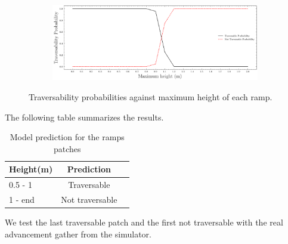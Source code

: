 \documentclass[../document.tex]{subfiles}
\begin{document}
\begin{figure} [htbp]
    \centering
\begin{subfigure}[b]{1\textwidth}
    \includegraphics[width=\linewidth]{../img/5/custom_patches/ramp/predictions.png}
    \end{subfigure}
    \caption{Traversability probabilities against maximum height of each ramp.}
\end{figure}
The following table summarizes the results.

\begin{table} [htbp]
    \centering
    \begin{tabular}{l|cc}
        Height(m) & Prediction \\ 
        \hline
        0.5 - 1  &  Traversable \\ 
        1 - end & Not traversable \\ 
        \hline
    \end{tabular}
    \caption{Model prediction for the ramps patches}
\end{table}
We test the last traversable patch and the first not traversable with the real advancement gather from the simulator.
\end{document}
